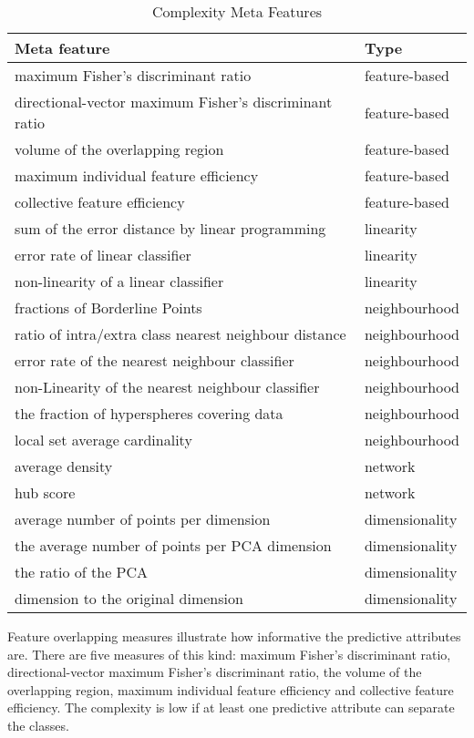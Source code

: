\begin{table}[!h]
    \centering
    \caption{Complexity Meta Features}
        \setlength{\tabcolsep}{8pt}
        \renewcommand{\arraystretch}{1.2}
        \begin{tabular}{ll}
        \hline
        Meta feature & Type \\ \hline
        maximum Fisher’s discriminant ratio & feature-based\\
        directional-vector maximum Fisher’s discriminant ratio & feature-based\\
        volume of the overlapping region & feature-based\\
        maximum individual feature efficiency & feature-based\\
        collective feature efficiency & feature-based\\
        sum of the error distance by linear programming & linearity\\
        error rate of linear classifier & linearity\\
        non-linearity of a linear classifier & linearity\\
        fractions of Borderline Points & neighbourhood\\ 
        ratio of intra/extra class nearest neighbour distance & neighbourhood\\ 
        error rate of the nearest neighbour classifier & neighbourhood\\ 
        non-Linearity of the nearest neighbour classifier & neighbourhood\\ 
        the fraction of hyperspheres covering data & neighbourhood\\ 
        local set average cardinality & neighbourhood\\ 
        average density & network\\
        hub score & network\\
        average number of points per dimension & dimensionality\\
        the average number of points per PCA dimension & dimensionality\\
        the ratio of the PCA & dimensionality\\
        dimension to the original dimension & dimensionality\\
        \hline
        \end{tabular}
    \label{tab:complexity-mf}
    \end{table}

    Feature overlapping measures illustrate how informative the predictive attributes are. There are five measures of this kind: maximum Fisher’s discriminant ratio, directional-vector maximum Fisher’s discriminant ratio, the volume of the overlapping region, maximum individual feature efficiency and collective feature efficiency. The complexity is low if at least one predictive attribute can separate the classes.


